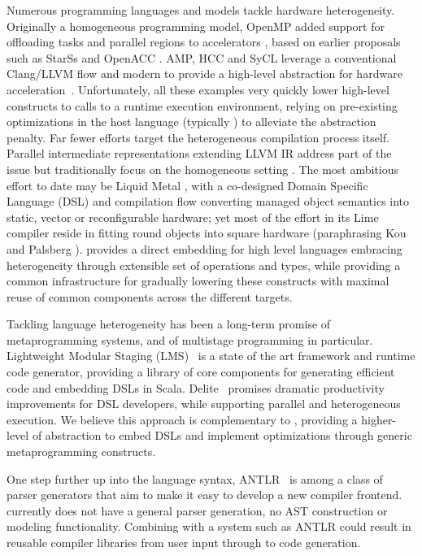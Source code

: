 Numerous programming languages and models tackle hardware heterogeneity. Originally a homogeneous programming model, OpenMP added support for offloading tasks and parallel regions to accelerators \cite{OpenMP}, based on earlier proposals such as StarSs and OpenACC \cite{DBLP:journals/ijhpca/PlanasBAL09,OpenACC}. \Cpp AMP, HCC and SyCL leverage a conventional Clang/LLVM flow and modern \Cpp to provide a high-level abstraction for hardware acceleration~\cite{SyCL}. Unfortunately, all these examples very quickly lower high-level constructs to calls to a runtime execution environment, relying on pre-existing optimizations in the host language (typically \Cpp) to alleviate the abstraction penalty. Far fewer efforts target the heterogeneous compilation process itself. Parallel intermediate representations extending LLVM IR address part of the issue but traditionally focus on the homogeneous setting \cite{Khaldi:2015:LPI:2833157.2833158,Schardl:2017:TEF:3155284.3018758}. The most ambitious effort to date may be Liquid Metal \cite{Auerbach:2012:CRH:2228360.2228411}, with a co-designed Domain Specific Language (DSL) and compilation flow converting managed object semantics into static, vector or reconfigurable hardware; yet most of the effort in its Lime compiler reside in fitting round objects into square hardware (paraphrasing Kou and Palsberg \cite{Kou:2010:OFF:1869459.1869470}). \MLIR provides a direct embedding for high level languages embracing heterogeneity through extensible set of operations and types, while providing a common infrastructure for gradually lowering these constructs with maximal reuse of common components across the different targets.

Tackling language heterogeneity has been a long-term promise of metaprogramming systems, and of multistage programming in particular. Lightweight Modular Staging (LMS)~\cite{DBLP:journals/cacm/RompfO12} is a state of the art framework and runtime code generator, providing a library of core components for generating efficient code and embedding DSLs in Scala. Delite~\cite{DBLP:journals/tecs/SujeethBLRCOO14} promises dramatic productivity improvements for DSL developers, while supporting parallel and heterogeneous execution. We believe this approach is complementary to \MLIR, providing a higher-level of abstraction to embed DSLs and implement optimizations through generic metaprogramming constructs.

One step further up into the language syntax,
ANTLR~\cite{antlr} is among a class of parser generators that aim to make it
easy to develop a new compiler frontend. \MLIR currently does not have a general
parser generation, no AST construction or modeling functionality.
Combining \MLIR
with a system such as ANTLR could result in reusable compiler libraries
from user input through to code generation.

